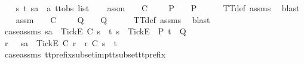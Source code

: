 \begin{isabellebody}
\isanewline
{}\isamarkupfalse%
\isanewline
\ \ \isamarkupfalse%
\ s\ t\ sa\ {\isacharcolon}{\isacharcolon}\ {\isachardoublequoteopen}{\isacharprime}a\ ttobs\ list{\isachardoublequoteclose}\isanewline
\ \ \isamarkupfalse%
\ assm{}{\isacharcolon}\ {\isachardoublequoteopen}{\isasymforall}{\isasymrho}\ {\isasymsigma}{\isachardot}\ {\isasymrho}\ {\isasymlesssim}\isactrlsub C\ {\isasymsigma}\ {\isasymand}\ {\isasymsigma}\ {\isasymin}\ P\ {\isasymlongrightarrow}\ {\isasymrho}\ {\isasymin}\ P{\isachardoublequoteclose}\isanewline
\ \ \ \ \isamarkupfalse%
\ TT{}{\isacharunderscore}def\ assms{\isacharparenleft}{}{\isacharparenright}\ \isamarkupfalse%
\ blast\isanewline
\ \ \isamarkupfalse%
\ assm{}{\isacharcolon}\ {\isachardoublequoteopen}{\isasymforall}{\isasymrho}\ {\isasymsigma}{\isachardot}\ {\isasymrho}\ {\isasymlesssim}\isactrlsub C\ {\isasymsigma}\ {\isasymand}\ {\isasymsigma}\ {\isasymin}\ Q\ {\isasymlongrightarrow}\ {\isasymrho}\ {\isasymin}\ Q{\isachardoublequoteclose}\isanewline
\ \ \ \ \isamarkupfalse%
\ TT{}{\isacharunderscore}def\ assms{\isacharparenleft}{}{\isacharparenright}\ \isamarkupfalse%
\ blast\isanewline
\ \ \isamarkupfalse%
\ case{\isacharunderscore}assms{\isacharcolon}\ {\isachardoublequoteopen}sa\ {\isacharat}\ {\isacharbrackleft}{\isacharbrackleft}Tick{\isacharbrackright}\isactrlsub E{\isacharbrackright}\ {\isasymlesssim}\isactrlsub C\ s\ {\isacharat}\ t{\isachardoublequoteclose}\ {\isachardoublequoteopen}s\ {\isacharat}\ {\isacharbrackleft}{\isacharbrackleft}Tick{\isacharbrackright}\isactrlsub E{\isacharbrackright}\ {\isasymin}\ P{\isachardoublequoteclose}\ {\isachardoublequoteopen}t\ {\isasymin}\ Q{\isachardoublequoteclose}\isanewline
\ \ \isamarkupfalse%
\ r\ \ {}{\isacharcolon}\ {\isachardoublequoteopen}sa\ {\isacharat}\ {\isacharbrackleft}{\isacharbrackleft}Tick{\isacharbrackright}\isactrlsub E{\isacharbrackright}\ {\isasymsubseteq}\isactrlsub C\ r\ {\isasymand}\ r\ {\isasymle}\isactrlsub C\ s\ {\isacharat}\ t{\isachardoublequoteclose}\isanewline
\ \ \ \ \isamarkupfalse%
\ case{\isacharunderscore}assms{\isacharparenleft}{}{\isacharparenright}\ tt{\isacharunderscore}prefix{\isacharunderscore}subset{\isacharunderscore}imp{\isacharunderscore}tt{\isacharunderscore}subset{\isacharunderscore}tt{\isacharunderscore}prefix\ \isamarkupfalse%

\end{isabellebody}
